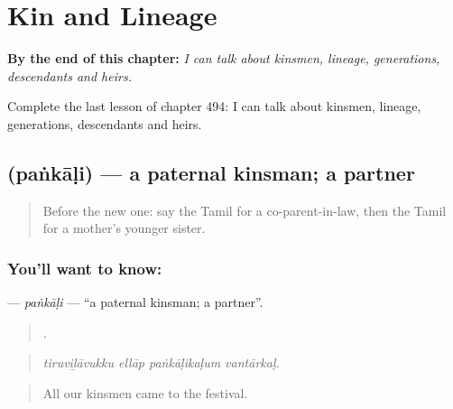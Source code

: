 
\chapter{Kin and Lineage}
\label{ch:ta-kin-and-lineage}

\begin{chapteropening}
\textbf{By the end of this chapter:} \emph{I can talk about kinsmen, lineage, generations, descendants and heirs.}

Complete the last lesson of chapter 494: I can talk about kinsmen, lineage, generations, descendants and heirs.
\end{chapteropening}

\section[\texorpdfstring{\ta{பங்காளி} (paṅkāḷi)}{பங்காளி (paṅkāḷi)}]{ (paṅkāḷi) — a paternal kinsman; a partner}

\label{lesson:TA-C494-pankali}



\begin{quote}
Before the new one: say the Tamil for a co-parent-in-law, then the Tamil for a mother’s younger sister.
\end{quote}

\subsection*{You'll want to know: }
\textbf{} — \emph{paṅkāḷi} — \textquotedblleft{}a paternal kinsman; a partner\textquotedblright{}.

\begin{quote}
   .
\end{quote}

\begin{quote}
\emph{tiruviḻāvukku ellāp paṅkāḷikaḷum vantārkaḷ.}
\end{quote}

\begin{quote}
All our kinsmen came to the festival.
\end{quote}

